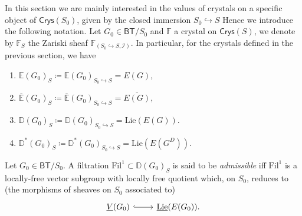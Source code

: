 \begin{ntt}[]\label{CrystalAssociatedZarSheafS}
	In this section we are mainly interested in the values of
	crystals on a specific object of $\mathsf{Crys}(S_0)$, given
	by the closed immersion $S_0 \hookrightarrow S$
	Hence we introduce the following notation.
	Let $G_0 \in \mathsf{BT}/S_0$ and $\mathbb{F}$ a crystal on $\mathsf{Crys}(S)$,
	we denote by $\mathbb{F}_S$ the Zariski sheaf
	$\mathbb{F}_{\left(S_0 \hookrightarrow S, \mathcal{I}\right)}$.
	In particular, for the crystals defined in the previous section, we have
\begin{enumerate}
	\item $\mathbb{E}(G_0)_S \coloneqq \mathbb{E}(G_0)_{S_0 \hookrightarrow S} = E(G)$,
	\item $\overline{\mathbb{E}}(G_0)_S \coloneqq \overline{\mathbb{E}}(G_0)_{S_0 \hookrightarrow S} = 
		\overline{E(G)}$,
	\item $\mathbb{D}(G_0)_S \coloneqq \mathbb{D}(G_0)_{S_0 \hookrightarrow S} = 
		\mathrm{Lie}(E(G))$.
	\item $\mathbb{D}^*(G_0)_S \coloneqq \mathbb{D}^*(G_0)_{S_0 \hookrightarrow S} = 
		\mathrm{Lie}(E(G^D))$.
\end{enumerate}
\end{ntt}


\begin{defn}
	Let $G_0 \in \mathsf{BT}/S_0$.
	A filtration $\mathrm{Fil}^1 \subset \mathbb{D}(G_0)_S$ is said to be
	{\em admissible} iff $\mathrm{Fil}^1$ is a locally-free vector subgroup
	with locally free quotient which, on $S_0$, reduces to
	(the morphisms of sheaves on $S_0$ associated to)
	\begin{equation*}
	\begin{tikzcd}[row sep = 0ex
		,/tikz/column 1/.append style={anchor=base east}
		,/tikz/column 2/.append style={anchor=base west}]
		\underline{V}(G_0) \arrow[r, "", hookrightarrow] &
		\underline{\mathrm{Lie}}(E(G_0))
	.\end{tikzcd}
	\end{equation*} 
\end{defn}


